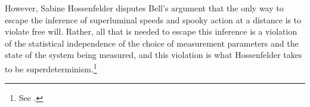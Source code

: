 \documentclass[12pt]{report}
\begin{document}
However, Sabine Hossenfelder disputes Bell's argument that the only way to escape the inference of superluminal speeds and spooky action at a distance is to violate free will. Rather, all that is needed to escape this inference is a violation of the statistical independence of the choice of measurement parameters and the state of the system being measured, and this violation is what Hossenfelder takes to be superdeterminism.\footnote{ See \cite{superdeterminism}.   }

\end{document}
